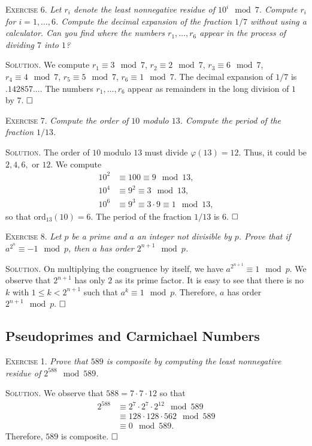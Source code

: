 \documentclass[11pt, leqno]{article}
\newcommand{\done}{\ensuremath{\hfill\square}}
\begin{document}
\textsc{Exercise 6}. \emph{Let $r_i$ denote the least nonnegative residue of $10^i \mod 7$. Compute $r_i$ for $i=1,\ldots,6$. Compute the decimal expansion of the fraction $1/7$ without using a calculator. Can you find where the numbers $r_1, \ldots, r_6$ appear in the process of dividing $7$ into $1$?}

\textsc{Solution}. We compute $r_1 \equiv 3 \mod 7$, $r_2 \equiv 2 \mod 7$, $r_3 \equiv 6 \mod 7$, $r_4 \equiv 4 \mod 7$, $r_5 \equiv 5 \mod 7$, $r_6 \equiv 1 \mod 7$. The decimal expansion of $1/7$ is $.142857...$. The numbers $r_1, \ldots, r_6$ appear as remainders in the long division of $1$ by $7$. \done

\textsc{Exercise 7}. \emph{Compute the order of $10$ modulo $13$. Compute the period of the fraction $1/13$.}

\textsc{Solution}. The order of $10$ modulo $13$ must divide $\varphi(13) = 12$. Thus, it could be $2, 4, 6, $ or $12$. We compute 
\begin{align*}
  10^2 &\equiv 100 \equiv 9 \mod 13, \\
  10^4 &\equiv 9^2 \equiv 3 \mod 13, \\
  10^6 &\equiv 9^3 \equiv 3\cdot 9 \equiv 1 \mod 13,
\end{align*}
so that ord$_{13}(10) = 6$. The period of the fraction $1/13$ is 6. \done

\textsc{Exercise 8}. \emph{Let $p$ be a prime and $a$ an integer not divisible by $p$. Prove that if $a^{2^n}\equiv -1 \mod p$, then $a$ has order $2^{n+1} \mod p$.}

\textsc{Solution}. On multiplying the congruence by itself, we have $a^{2^{n+1}} \equiv 1 \mod p$. We observe that $2^{n+1}$ has only $2$ as its prime factor. It is easy to see that there is no $k$ with $1\leq k < 2^{n+1}$ such that $a^k \equiv 1 \mod p$. Therefore, $a$ has order $2^{n+1}\mod p$. \done

\subsection{Pseudoprimes and Carmichael Numbers}

\textsc{Exercise 1}. \emph{Prove that $589$ is composite by computing the least nonnegative residue of $2^{588} \mod 589$.}

\textsc{Solution}. We observe that $588 = 7\cdot 7 \cdot 12$ so that 
\begin{align*}
  2^{588} &\equiv 2^7\cdot 2^7 \cdot 2^{12} \mod 589 \\
          &\equiv 128 \cdot 128 \cdot 562 \mod 589 \\
          &\equiv 0 \mod 589.
\end{align*}
Therefore, $589$ is composite. \done
\end{document}
